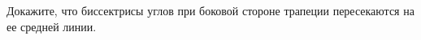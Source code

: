 \begin{ex}
	\begin{condition}
		Докажите, что биссектрисы углов при боковой стороне трапеции пересекаются на ее средней линии.
	\end{condition}
\end{ex}